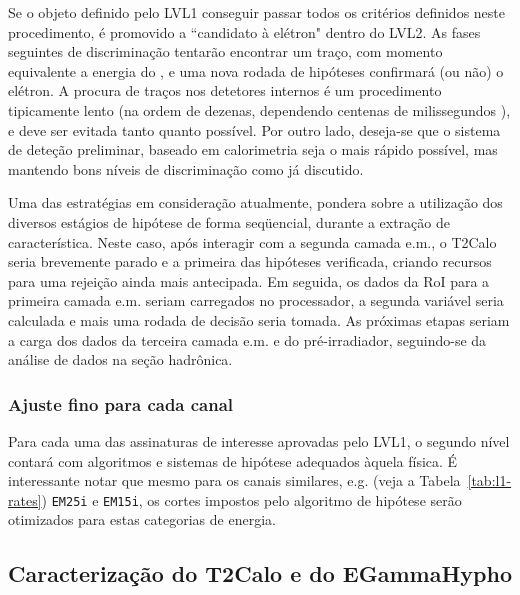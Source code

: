 Se o objeto definido pelo LVL1 conseguir passar todos os critérios definidos
neste procedimento, é promovido a ``candidato à elétron" dentro do LVL2. As
fases seguintes de discriminação tentarão encontrar um traço, com momento
equivalente a energia do , e uma nova rodada de hipóteses
confirmará (ou não) o elétron. A procura de traços nos detetores internos é um
procedimento tipicamente lento (na ordem de dezenas, dependendo centenas de
milissegundos \cite{hlt-tdr}), e deve ser evitada tanto quanto possível. Por
outro lado, deseja-se que o sistema de deteção preliminar, baseado em
calorimetria seja o mais rápido possível, mas mantendo bons níveis de
discriminação como já discutido.

Uma das estratégias em consideração atualmente, pondera sobre a utilização dos
diversos estágios de hipótese de forma seqüencial, durante a extração de
característica. Neste caso, após interagir com a segunda camada e.m., o T2Calo
seria brevemente parado e a primeira das hipóteses verificada, criando
recursos para uma rejeição ainda mais antecipada. Em seguida, os dados da RoI
para a primeira camada e.m. seriam carregados no processador, a segunda
variável seria calculada e mais uma rodada de decisão seria tomada. As
próximas etapas seriam a carga dos dados da terceira camada e.m. e do
pré-irradiador, seguindo-se da análise de dados na seção hadrônica. 

\subsubsection{Ajuste fino para cada canal}

Para cada uma das assinaturas de interesse aprovadas pelo LVL1, o segundo
nível contará com algoritmos e sistemas de hipótese adequados àquela física. É
interessante notar que mesmo para os canais similares, e.g. (veja a
Tabela~\ref{tab:l1-rates}) \texttt{EM25i} e \texttt{EM15i}, os cortes impostos
pelo algoritmo de hipótese serão otimizados para estas categorias de
energia. 


\subsection{Caracterização do T2Calo e do EGammaHypho}
\label{sec:def-eghypo}

